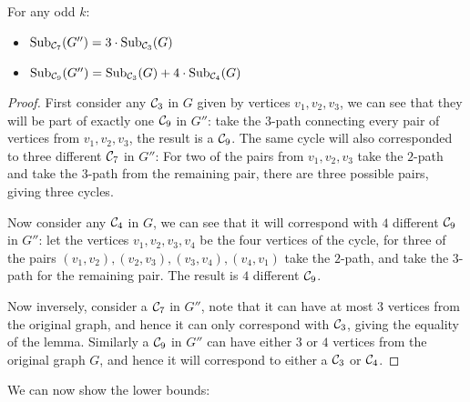\documentclass[a4paper,UKenglish,cleveref, autoref, numberwithinsect, thm-restate]{lipics-v2021}
\newcommand{\cycle}[1]{\cC_{#1}}
\newcommand{\expandGOdd}{G''}
\newcommand{\Sub}[2]{\mathrm{Sub}_{#2}(#1)}
\newcommand{\cC}{{\cal C}}
\begin{document}
		\begin{lemma} \label{lem:equivalence2}
			For any odd $k$:
			\begin{itemize}
				\item $\Sub{\expandGOdd}{\cycle{7}} = 3 \cdot \Sub{G}{\cycle{3}}$
				\item $\Sub{\expandGOdd}{\cycle{9}} = \Sub{G}{\cycle{3}} + 4 \cdot \Sub{G}{\cycle{4}} $
			\end{itemize}
		\end{lemma}
		\begin{proof}
			First consider any $\cycle{3}$ in $G$ given by vertices $v_1,v_2,v_3$, we can see that they will be part of exactly one $\cycle{9}$ in $\expandGOdd$: take the $3$-path connecting every pair of vertices from $v_1,v_2,v_3$, the result is a $\cycle{9}$. The same cycle will also corresponded to three different $\cycle{7}$ in $\expandGOdd$: For two of the pairs from $v_1,v_2,v_3$ take the $2$-path and take the $3$-path from the remaining pair, there are three possible pairs, giving three cycles.
			
			Now consider any $\cycle{4}$ in $G$, we can see that it will correspond with $4$ different $\cycle{9}$ in $\expandGOdd$: let the vertices $v_1,v_2,v_3,v_4$ be the four vertices of the cycle, for three of the pairs $(v_1,v_2),(v_2,v_3),(v_3,v_4),(v_4,v_1)$ take the $2$-path, and take the $3$-path for the remaining pair. The result is $4$ different $\cycle{9}$.
			
			Now inversely, consider a $\cycle{7}$ in $\expandGOdd$, note that it can have at most $3$ vertices from the original graph, and hence it can only correspond with $\cycle{3}$, giving the equality of the lemma. Similarly a $\cycle{9}$ in $\expandGOdd$ can have either $3$ or $4$ vertices from the original graph $G$, and hence it will correspond to either a $\cycle{3}$ or $\cycle{4}$.
		\end{proof}
		
		We can now show the lower bounds:
		
\end{document}
